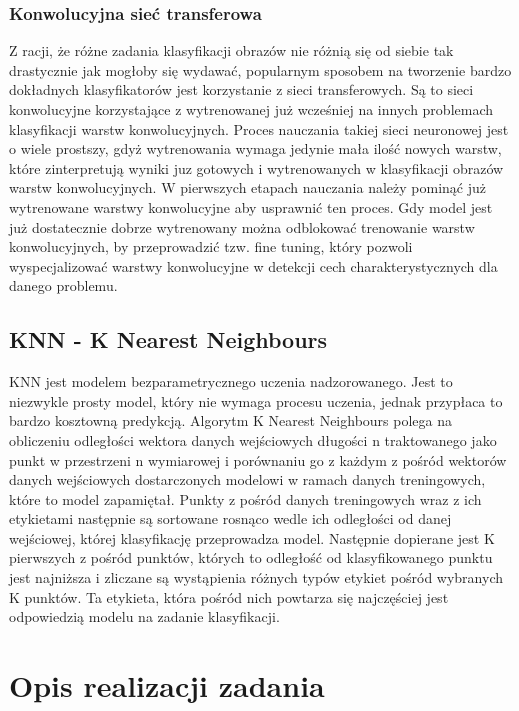 \documentclass{article}
\begin{document}
\subsubsection{Konwolucyjna sieć transferowa}
Z racji, że różne zadania klasyfikacji obrazów nie różnią się od siebie tak drastycznie jak 
mogłoby się wydawać, popularnym sposobem na tworzenie bardzo dokładnych 
klasyfikatorów jest korzystanie z sieci transferowych. Są to sieci konwolucyjne korzystające 
z wytrenowanej już wcześniej na innych problemach klasyfikacji warstw konwolucyjnych. 
Proces nauczania takiej sieci neuronowej jest o wiele prostszy, gdyż wytrenowania wymaga 
jedynie mała ilość nowych warstw, które zinterpretują wyniki juz gotowych i wytrenowanych 
w klasyfikacji obrazów warstw konwolucyjnych. W pierwszych etapach nauczania należy pominąć 
już wytrenowane warstwy konwolucyjne aby usprawnić ten proces. Gdy model jest już dostatecznie 
dobrze wytrenowany można odblokować trenowanie warstw konwolucyjnych, by przeprowadzić tzw. 
fine tuning, który pozwoli wyspecjalizować warstwy konwolucyjne w detekcji cech charakterystycznych 
dla danego problemu. 


\subsection{KNN - K Nearest Neighbours}
KNN jest modelem bezparametrycznego uczenia nadzorowanego. Jest to niezwykle prosty model,
 który nie wymaga procesu uczenia, jednak przypłaca to bardzo kosztowną predykcją.
Algorytm K Nearest Neighbours polega na obliczeniu odległości wektora danych wejściowych 
długości n traktowanego jako punkt w przestrzeni n wymiarowej i porównaniu go z każdym z 
pośród wektorów danych wejściowych dostarczonych modelowi w ramach danych treningowych, 
które to model zapamiętał. Punkty z pośród danych treningowych wraz z ich etykietami 
następnie są sortowane rosnąco wedle ich odległości od danej wejściowej, której 
klasyfikację przeprowadza model. Następnie dopierane jest K pierwszych z pośród 
punktów, których to odległość od klasyfikowanego punktu jest najniższa i zliczane 
są wystąpienia różnych typów etykiet pośród wybranych K punktów. Ta etykieta, 
która pośród nich powtarza się najczęściej jest odpowiedzią modelu na zadanie klasyfikacji.

\section{Opis realizacji zadania}
\end{document}
